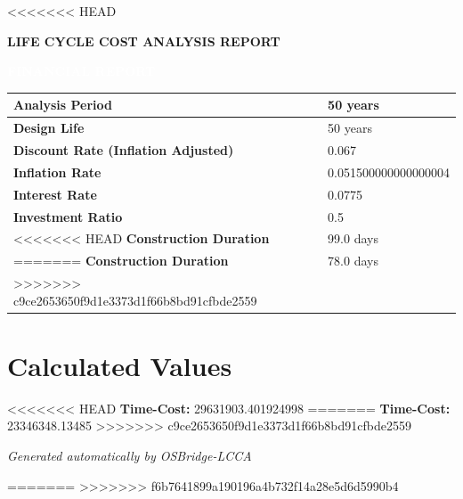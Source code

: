 \documentclass[a4paper,12pt]{article}
\begin{document}
<<<<<<< HEAD
\vspace*{0.6cm}

\begin{center}
\textbf{\fontsize{18pt}{20pt}\selectfont LIFE CYCLE COST ANALYSIS REPORT}
\end{center}

\vspace{0.4cm}

\begin{center}
\colorbox{osgreen}{%
    \parbox{0.8\linewidth}{%
        \centering
        \textcolor{white}{\textbf{FINANCIAL REPORT}}
    }
}
\end{center}

\vspace{0.4cm}

\begin{center}
\begin{tabular}{|p{7cm}|p{5cm}|}
\hline
\textbf{Analysis Period} & 50 years \\ \hline
\textbf{Design Life} & 50 years \\ \hline
\textbf{Discount Rate (Inflation Adjusted)} & 0.067 \\ \hline
\textbf{Inflation Rate} & 0.051500000000000004 \\ \hline
\textbf{Interest Rate} & 0.0775 \\ \hline
\textbf{Investment Ratio} & 0.5 \\ \hline
<<<<<<< HEAD
\textbf{Construction Duration} & 99.0 days \\ \hline
=======
\textbf{Construction Duration} & 78.0 days \\ \hline
>>>>>>> c9ce2653650f9d1e3373d1f66b8bd91cfbde2559
\end{tabular}
\end{center}

\vspace{0.3cm}

\section*{Calculated Values}
<<<<<<< HEAD
\textbf{Time-Cost:} 29631903.401924998
=======
\textbf{Time-Cost:} 23346348.13485
>>>>>>> c9ce2653650f9d1e3373d1f66b8bd91cfbde2559

\vfill

{\centering
\textit{Generated automatically by OSBridge-LCCA} \par
}
=======
\vspace*{6cm} %
>>>>>>> f6b7641899a190196a4b732f14a28e5d6d5990b4
\end{document}
